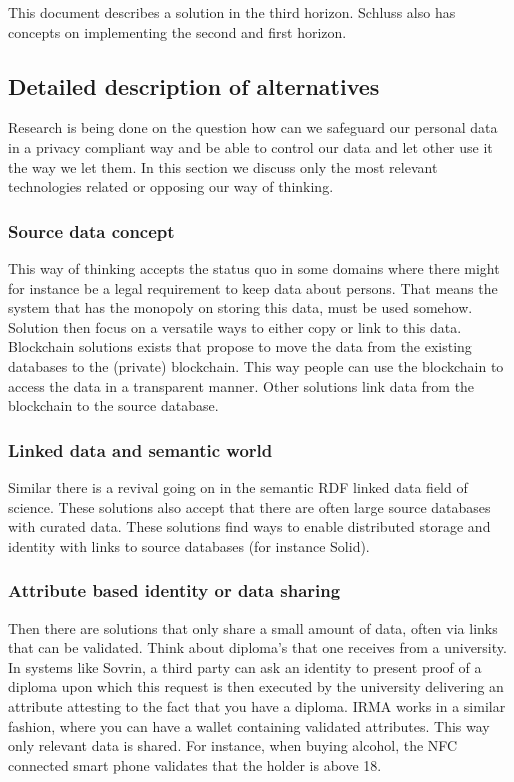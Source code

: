 \documentclass{article}
\begin{document}
This document describes a solution in the third horizon. Schluss also has concepts on implementing the second and first horizon.

\subsection{Detailed description of alternatives}
%
Research is being done on the question how can we safeguard our personal data in a privacy compliant way and be able to control our data and let other use it the way we let them. In this section we discuss only the most relevant technologies related or opposing our way of thinking.

\subsubsection{Source data concept}
This way of thinking accepts the status quo in some domains where there might for instance be a legal requirement to keep data about persons. That means the system that has the monopoly on storing this data, must be used somehow. Solution then focus on a versatile ways to either copy or link to this data. Blockchain solutions exists that propose to move the data from the existing databases to the (private) blockchain. This way people can use the blockchain to access the data in a transparent manner. Other solutions link data from the blockchain to the source database.

\subsubsection{Linked data and semantic world}
Similar there is a revival going on in the semantic RDF linked data field of science. These solutions also accept that there are often large source databases with curated data. These solutions find ways to enable distributed storage and identity with links to source databases (for instance Solid).

\subsubsection{Attribute based identity or data sharing}
Then there are solutions that only share a small amount of data, often via links that can be validated. Think about diploma's that one receives from a university. In systems like Sovrin, a third party can ask an identity to present proof of a diploma upon which this request is then executed by the university delivering an attribute attesting to the fact that you have a diploma. IRMA works in a similar fashion, where you can have a wallet containing validated attributes. This way only relevant data is shared. For instance, when buying alcohol, the NFC connected smart phone validates that the holder is above 18.
\end{document}

